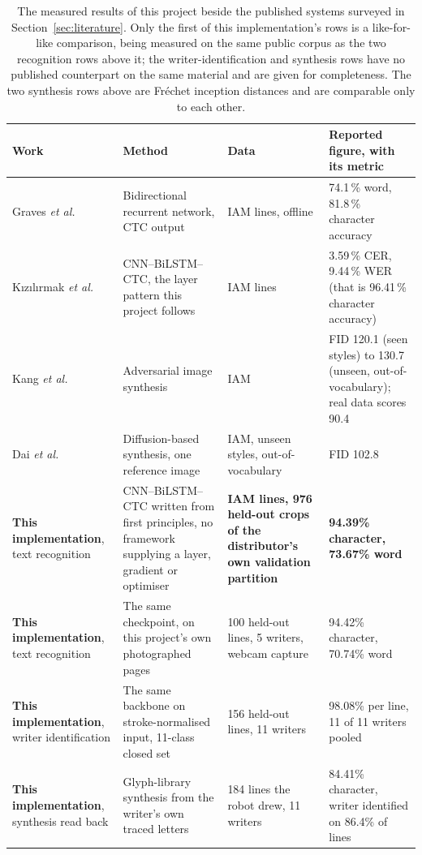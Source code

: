 \begin{table}[!htbp]
\centering
\fontsize{8}{9.4}\selectfont
\setlength{\tabcolsep}{4pt}
\begin{tabular}{|p{3.0cm}|p{4.0cm}|p{3.0cm}|p{3.2cm}|}
\hline
\textbf{Work} & \textbf{Method} & \textbf{Data} & \textbf{Reported figure, with its metric} \\
\hline
Graves \emph{et al.}~\cite[p.~855]{graves2009} & Bidirectional recurrent network, CTC output & IAM lines, offline & 74.1\,\% word, 81.8\,\% character accuracy \\
\hline
K{\i}z{\i}l{\i}rmak \emph{et al.}~\cite[p.~1]{kizilirmak2023} & CNN--BiLSTM--CTC, the layer pattern this project follows & IAM lines & 3.59\,\% CER, 9.44\,\% WER (that is 96.41\,\% character accuracy) \\
\hline
Kang \emph{et al.}~\cite[Tab.~1]{kang2020} & Adversarial image synthesis & IAM & FID 120.1 (seen styles) to 130.7 (unseen, out-of-vocabulary); real data scores 90.4 \\
\hline
Dai \emph{et al.}~\cite[Tab.~3]{dai2024} & Diffusion-based synthesis, one reference image & IAM, unseen styles, out-of-vocabulary & FID 102.8 \\
\hline
\textbf{This implementation}, text recognition & CNN--BiLSTM--CTC written from first principles, no framework supplying a layer, gradient or optimiser & \textbf{IAM lines, 976 held-out crops of the distributor's own validation partition} & \textbf{94.39\% character, 73.67\% word} \\
\hline
\textbf{This implementation}, text recognition & The same checkpoint, on this project's own photographed pages & 100 held-out lines, 5 writers, webcam capture & 94.42\% character, 70.74\% word \\
\hline
\textbf{This implementation}, writer identification & The same backbone on stroke-normalised input, 11-class closed set & 156 held-out lines, 11 writers & 98.08\% per line, 11 of 11 writers pooled \\
\hline
\textbf{This implementation}, synthesis read back & Glyph-library synthesis from the writer's own traced letters & 184 lines the robot drew, 11 writers & 84.41\% character, writer identified on 86.4\% of lines \\
\hline
\end{tabular}
\caption{The measured results of this project beside the published systems surveyed in Section~\ref{sec:literature}. Only the first of this implementation's rows is a like-for-like comparison, being measured on the same public corpus as the two recognition rows above it; the writer-identification and synthesis rows have no published counterpart on the same material and are given for completeness. The two synthesis rows above are Fr\'echet inception distances and are comparable only to each other.}
\label{tab:dis-compare}
\end{table}


